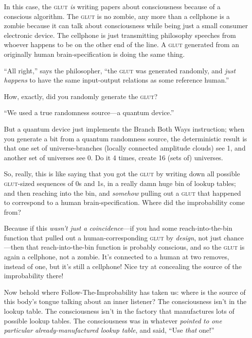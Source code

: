 {
 In this case, the \textsc{glut} \textit{is} writing papers about
consciousness because of a conscious algorithm. The \textsc{glut} is no zombie,
any more than a cellphone is a zombie because it can talk about
consciousness while being just a small consumer electronic device. The
cellphone is just transmitting philosophy speeches from whoever happens
to be on the other end of the line. A \textsc{glut} generated from an originally
human brain-specification is doing the same thing.}

{
 ``All right,'' says the
philosopher, ``the \textsc{glut} was generated randomly, and
\textit{just happens} to have the same input-output relations as some
reference human.''}

{
 How, exactly, did you randomly generate the \textsc{glut}?}

{
 ``We used a true randomness source---a quantum
device.''}

{
 But a quantum device just implements the Branch Both Ways
instruction; when you generate a bit from a quantum randomness source,
the deterministic result is that one set of universe-branches (locally
connected amplitude clouds) see 1, and another set of universes see 0.
Do it 4 times, create 16 (sets of) universes.}

{
 So, really, this is like saying that you got the \textsc{glut} by writing
down all possible \textsc{glut}-sized sequences of 0s and 1s, in a really damn
huge bin of lookup tables; and then reaching into the bin, and
\textit{somehow} pulling out a \textsc{glut} that happened to correspond to a
human brain-specification. Where did the improbability come from?}

{
 Because if this \textit{wasn't just a
coincidence}{}---if you had some reach-into-the-bin function that
pulled out a human-corresponding \textsc{glut} by \textit{design}, not just
chance---then that reach-into-the-bin function is probably conscious,
and so the \textsc{glut} is again a cellphone, not a zombie.
It's connected to a human at two removes, instead of
one, but it's still a cellphone! Nice try at concealing
the source of the improbability there!}

{
 Now behold where Follow-The-Improbability has taken us: where is
the source of this body's tongue talking about an inner
listener? The consciousness isn't in the lookup table.
The consciousness isn't in the factory that
manufactures lots of possible lookup tables. The consciousness was in
whatever \textit{pointed to one particular already-manufactured lookup
table}, and said, ``Use \textit{that}
one!''}

